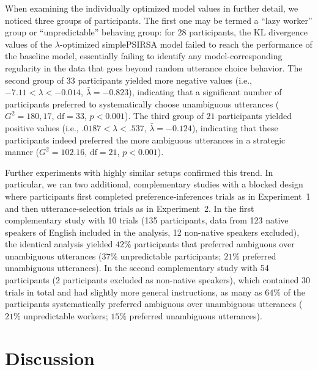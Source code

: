 \documentclass[11pt,a4paper]{article}
\begin{document}
When examining the individually optimized model values in further detail, we noticed three groups of participants. 
The first one may be termed a ``lazy worker'' group or ``unpredictable'' behaving group:
for $28$ participants, the KL divergence values of the $\lambda$-optimized simplePSIRSA model failed to reach the performance of the baseline model, essentially failing to identify any model-corresponding regularity in the data that goes beyond random utterance choice behavior.
The second group of $33$ participants yielded more negative values (i.e., $-7.11<\lambda<-0.014$, $\bar{\lambda}=-0.823$), indicating that a significant number of participants preferred to systematically choose unambiguous utterances ($G^2=180,17$, $\textrm{df}=33$, $p<0.001$). 
The third group of $21$ participants yielded positive values (i.e., $.0187<\lambda<.537$, $\bar{\lambda}=-0.124$), indicating that these participants indeed preferred the more ambiguous utterances in a strategic manner ($G^2=102.16$, $\textrm{df}=21$, $p<0.001$).


Further experiments with highly similar setups confirmed this trend.
In particular, we ran two additional, complementary studies with a blocked design where participants first completed preference-inferences trials as in Experiment~1 and then utterance-selection trials as in Experiment~2. 
In the first complementary study with 10 trials (135 participants, data from 123 native speakers of English included in the analysis, 12 non-native speakers excluded), the identical analysis yielded $42\%$ participants that preferred ambiguous over unambiguous utterances ($37\%$ unpredictable participants; $21\%$ preferred unambiguous utterances). 
In the second complementary study with 54 participants (2 participants excluded as non-native speakers), which contained 30 trials in total and had slightly more general instructions, as many as $64\%$ of the participants systematically preferred ambiguous over unambiguous utterances ($21\%$ unpredictable workers; $15\%$ preferred unambiguous utterances). 



\section{Discussion}
\end{document}
